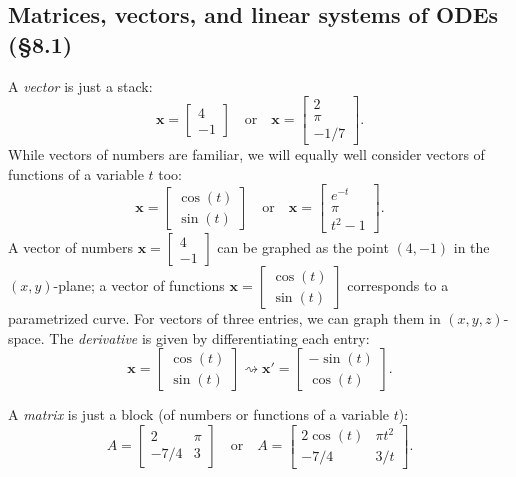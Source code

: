 \documentclass[12pt]{amsart}
\numberwithin{equation}{section}
\theoremstyle{plain} %
\newcommand{\rsa}{\rightsquigarrow}
\theoremstyle{definition}
\theoremstyle{remark}
\begin{document}
\subsection*{Matrices, vectors, and linear systems of ODEs (\S8.1)}

\renewcommand{\arraystretch}{1}

A \emph{vector} is just a stack:
\[ \mathbf{x}= \begin{bmatrix} 4 \\ -1\end{bmatrix} \quad \text{or} \quad \mathbf{x}=\begin{bmatrix} 2 \\ \pi \\ -1/7\end{bmatrix}.\]
While vectors of numbers are familiar, we will equally well consider vectors of functions of a variable $t$ too:
\[ \mathbf{x}= \begin{bmatrix} \cos(t) \\ \sin(t) \end{bmatrix} \quad \text{or} \quad \mathbf{x}=\begin{bmatrix} e^{-t} \\ \pi \\ t^2-1 \end{bmatrix}.\]
A vector of numbers $\mathbf{x}= \begin{bmatrix} 4 \\ -1\end{bmatrix}$ can be graphed as the point $(4,-1)$ in the $(x,y)$-plane; a vector of functions $\mathbf{x}= \begin{bmatrix} \cos(t) \\ \sin(t) \end{bmatrix}$ corresponds to a parametrized curve. For vectors of three entries, we can graph them in $(x,y,z)$-space. The \emph{derivative} is given by differentiating each entry:
\[ \mathbf{x}= \begin{bmatrix} \cos(t) \\ \sin(t) \end{bmatrix} \rsa  \mathbf{x'}= \begin{bmatrix} -\sin(t) \\ \cos(t) \end{bmatrix}.\]


A \emph{matrix} is just a block (of numbers or functions of a variable $t$):
\[ A= \begin{bmatrix} 2 & \pi \\ -7/4 & 3\end{bmatrix} \quad \text{or} \quad A=\begin{bmatrix} 2 \cos(t) & \pi t^2 \\ -7/4 & 3/t \end{bmatrix}.\]
\end{document}
